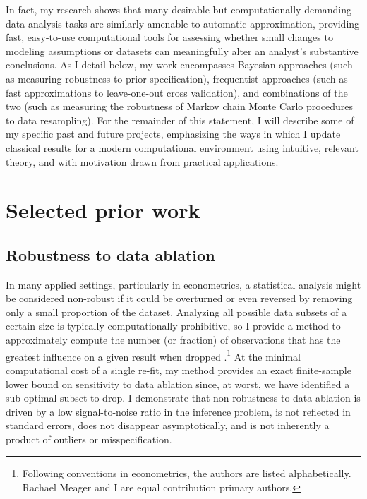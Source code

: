 In fact, my research shows that many desirable but computationally demanding
data analysis tasks are similarly amenable to automatic approximation, providing
fast, easy-to-use computational tools for assessing whether small changes to
modeling assumptions or datasets can meaningfully alter an analyst's substantive
conclusions.  As I detail below, my work encompasses Bayesian approaches (such
as measuring robustness to prior specification), frequentist approaches (such as
fast approximations to leave-one-out cross validation), and combinations of the
two (such as measuring the robustness of Markov chain Monte Carlo procedures to
data resampling).
For the remainder of this statement, I will describe some of my specific past
and future projects, emphasizing the ways in which I update classical results
for a modern computational environment using intuitive, relevant theory, and
with motivation drawn from practical applications.

\section{Selected prior work}

\subsection{Robustness to data ablation}
%
In many applied settings, particularly in econometrics, a statistical analysis
might be considered non-robust if it could be overturned or even reversed by
removing only a small proportion of the dataset. Analyzing all possible data
subsets of a certain size is typically computationally prohibitive, so I provide
a method to approximately compute the number (or fraction) of observations that
has the greatest influence on a given result when dropped
\citep{giordano:2020:amip}.\footnote{Following conventions in econometrics, the
authors are listed alphabetically.  Rachael Meager and I are equal contribution
primary authors.}
%
At the minimal computational cost of a single re-fit, my method provides an
exact finite-sample lower bound on sensitivity to data ablation since, at worst,
we have identified a sub-optimal subset to drop.
%
I demonstrate that non-robustness to data ablation is driven by a
low signal-to-noise ratio in the inference problem, is not reflected in standard
errors, does not disappear asymptotically, and is not inherently a product of
outliers or misspecification.

